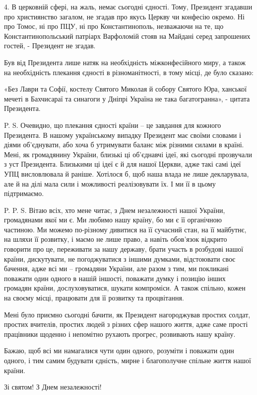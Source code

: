 4. В церковній сфері, на жаль, немає сьогодні єдності. Тому, Президент згадавши
про християнство загалом, не згадав про якусь Церкву чи конфесію окремо. Ні про
Томос, ні про ПЦУ, ні про Константинополь, незважаючи на те, що
Константинопольський патріарх Варфоломій стояв на Майдані серед запрошених
гостей, - Президент не згадав.

Був від Президента лише натяк на необхідність міжконфесійного миру, а також на
необхідність плекання єдності в різноманітності, в тому місці, де було сказано: 

«Без Лаври та Софії, костелу Святого Миколая й собору Святого Юра, ханської
мечеті в Бахчисараї та синагоги у Дніпрі Україна не така багатогранна», -
цитата Президента.

P. S. Очевидно, що плекання єдності країни – це завдання для кожного
Президента. В нашому українському випадку Президент має своїми словами і діями
об’єднувати, або хоча б утримувати баланс між різними силами в країні. Мені, як
громадянину України, близькі ці об'єднавчі ідеї, які сьогодні прозвучали з уст
Президента. Близькими ці ідеї є й для нашої Церкви, адже такі самі ідеї УПЦ
висловлювала й раніше. Хотілося б, щоб наша влада не лише декларувала, але й на
ділі мала сили і можливості реалізовувати їх. І ми її в цьому підтримаємо. 

P. P. S. Вітаю всіх, хто мене читає, з Днем незалежності нашої України,
громадянами якої ми є. Ми любимо нашу країну, бо ми є її органічною частиною.
Ми можемо по-різному дивитися на її сучасний стан, на її майбутнє, на шляхи її
розвитку, і маємо не лише право, а навіть обов’язок відкрито говорити про це,
переживати за нашу державу, брати участь в розбудові нашої країни, дискутувати,
не погоджуватися з іншими думками, відстоювати своє бачення, адже всі ми –
громадяни України, але разом з тим, ми покликані поважати один одного в нашій
іншості, поважати думку і позицію інших громадян країни, дослуховуватися,
шукати компроміси. А також спільно, кожен на своєму місці, працювати для її
розвитку та процвітання. 

Мені було приємно сьогодні бачити, як Президент нагороджував простих солдат,
простих вчителів, простих людей з різних сфер нашого життя, адже саме прості
працівники щоденно і непомітно рухають прогрес, розвивають нашу країну.

Бажаю, щоб всі ми намагалися чути один одного, розуміти і поважати один одного,
і тим самим будувати єдність, мирне і благополучне спільне життя нашої країни. 

Зі святом! З Днем незалежності!
